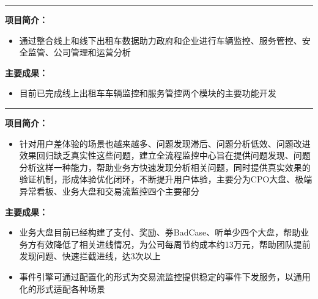 \documentclass{resume}
\begin{document}
\rule{\textwidth}{0.1mm}
\textbf{项目简介：}
\begin{itemize}
  \item 通过整合线上和线下出租车数据助力政府和企业进行车辆监控、服务管控、安全监管、公司管理和运营分析
\end{itemize}
\textbf{主要成果：}
\begin{itemize}
  \item 目前已完成线上出租车车辆监控和服务管控两个模块的主要功能开发
\end{itemize}

\rule{\textwidth}{0.1mm}
\textbf{项目简介：}
\begin{itemize}
  \item 针对用户差体验的场景也越来越多、问题发现滞后、问题分析低效、问题改进效果回归缺乏真实性这些问题，建立全流程监控中心旨在提供问题发现、问题分析这样一种能力，帮助业务方快速发现分析相关问题，同时提供真实效果的验证机制，形成体验优化闭环，不断提升用户体验，主要分为CPO大盘、极端异常看板、业务大盘和交易流监控四个主要部分
\end{itemize}
\textbf{主要成果：}
\begin{itemize}
  \item 业务大盘目前已经构建了支付、奖励、券BadCase、听单少四个大盘，帮助业务方有效降低了相关进线情况，为公司每周节约成本约13万元，帮助团队提前发现问题、快速拦截进线，达3次以上
  \item 事件引擎可通过配置化的形式为交易流监控提供稳定的事件下发服务，以通用化的形式适配各种场景
\end{itemize}
\end{document}
